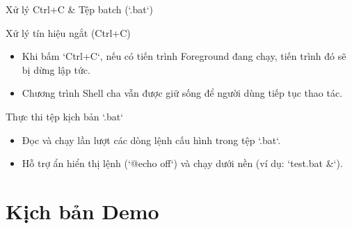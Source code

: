 \documentclass{beamer}
\begin{document}
\begin{frame}{Xử lý Ctrl+C \& Tệp batch (`.bat`)}
    \begin{block}{Xử lý tín hiệu ngắt (Ctrl+C)}
        \begin{itemize}
            \item Khi bấm `Ctrl+C`, nếu có tiến trình Foreground đang chạy, tiến trình đó sẽ bị dừng lập tức.
            \item Chương trình Shell cha vẫn được giữ sống để người dùng tiếp tục thao tác.
        \end{itemize}
    \end{block}
    \begin{block}{Thực thi tệp kịch bản `.bat`}
        \begin{itemize}
            \item Đọc và chạy lần lượt các dòng lệnh cấu hình trong tệp `.bat`.
            \item Hỗ trợ ẩn hiển thị lệnh (`@echo off`) và chạy dưới nền (ví dụ: `test.bat &`).
        \end{itemize}
    \end{block}
\end{frame}

\section{Kịch bản Demo}
\end{document}
